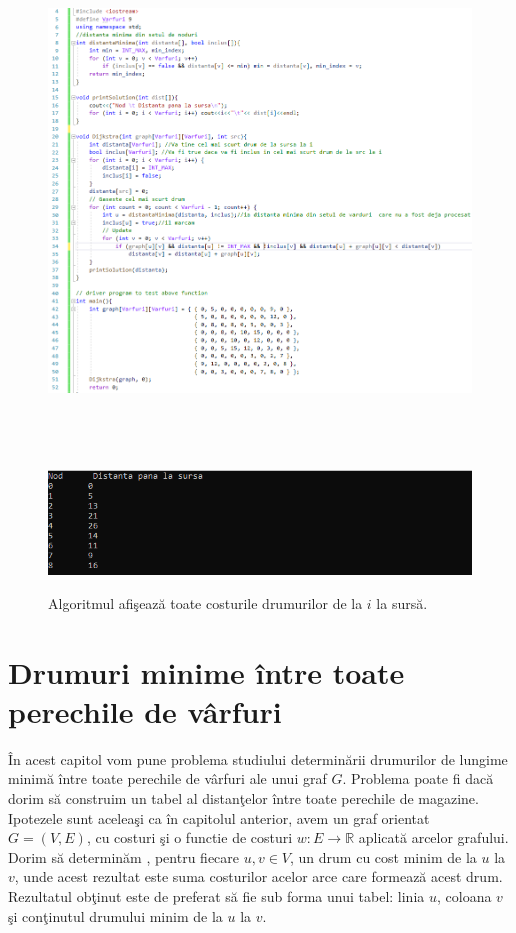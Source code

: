 \documentclass[11pt,a4paper]{report}
\newcommand{\R}{\mathbb{R}}
\begin{document}
     \begin{figure}[!hbt]
    	\centering
    	\includegraphics[width=13.2cm,height=14cm]{Dijkstra_cod.png}
    	\includegraphics[width=13.2cm]{Dijkstra_output.png}
    	\caption{Algoritmul afi\c seaz\u a toate costurile drumurilor de la $i$ la surs\u a.}
    \end{figure}
     \chapter{Drumuri minime \^ intre toate perechile de v\^ arfuri}
     
     \^ In acest capitol vom pune problema studiului determin\u arii drumurilor de lungime minim\u a \^ intre toate perechile de v\^ arfuri ale unui graf $G$. Problema poate fi dac\u a dorim s\u a construim un tabel al distan\c telor \^ intre toate perechile de magazine. Ipotezele sunt acelea\c si ca \^ in capitolul anterior, avem un graf orientat $G=(V,E)$, cu costuri \c si o functie de costuri $w:E \longrightarrow \R $ aplicat\u a arcelor grafului. Dorim s\u a determin\u am , pentru fiecare $u,v\in V$, un drum cu cost minim de la $u$ la $v$, unde acest rezultat este suma costurilor acelor arce care formeaz\u a acest drum. Rezultatul ob\c tinut este de preferat s\u a fie sub forma unui tabel: linia $u$, coloana $v$ \c si con\c tinutul drumului minim de la $u$ la $v$.
     
\end{document}
